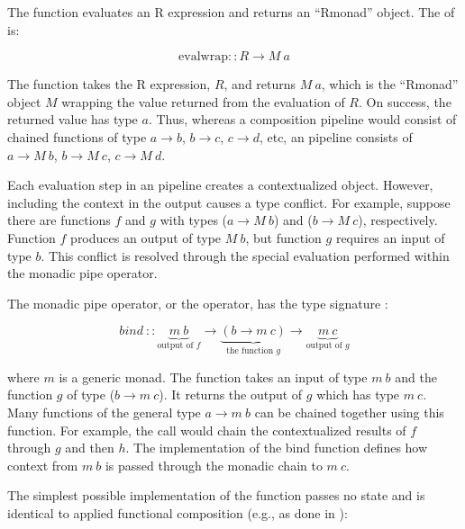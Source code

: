 The  function  evaluates an R expression and returns an ``Rmonad'' object. The
 of  is:

\begin{equation}
    \text{evalwrap} :: R \rightarrow M\ a
\end{equation}

The  function takes the R expression, $R$, and returns $M\ a$,
which is the ``Rmonad'' object $M$ wrapping the value returned from the
evaluation of $R$. On success, the returned value has type $a$. Thus, whereas a
composition pipeline would consist of chained functions of type $a \rightarrow
b$, $b \rightarrow c$, $c \rightarrow d$, etc, an  pipeline
consists of $a \rightarrow M\ b$, $b \rightarrow M\ c$, $c \rightarrow M\ d$.

Each evaluation step in an  pipeline creates a contextualized
object. However, including the context in the output causes a type conflict.
For example, suppose there are functions $f$ and $g$ with types ($a \rightarrow
M\ b$) and ($b \rightarrow M\ c$), respectively.  Function $f$  produces an
output of type $M\ b$, but function $g$ requires an input of type $b$.  This
conflict is resolved through the special evaluation performed within the
monadic pipe operator.

The monadic pipe operator, or the  operator, has the type signature \citep{wadler1990comprehending}:

\begin{equation}
  bind\ ::
  \underbrace{m\ b}_{\text{output of $f$}} \rightarrow
  \underbrace{(b \rightarrow m\ c)}_{\text{the function $g$}} \rightarrow
  \underbrace{m\ c}_{\text{output of $g$}}
\end{equation}

\noindent
where $m$ is a generic monad. The function  takes an input of type
$m\ b$ and the function $g$ of type ($b \rightarrow m\ c$). It returns the
output of $g$ which has type $m\ c$. Many functions of the general type $a
\rightarrow m\ b$ can be chained together using this  function.  For
example, the call  would chain the contextualized
results of $f$ through $g$ and then $h$. The implementation of the bind
function defines how context from $m\ b$ is passed through the monadic chain to
$m\ c$.

The simplest possible implementation of the  function passes no
state and is identical to applied functional composition (e.g., as done in
):

